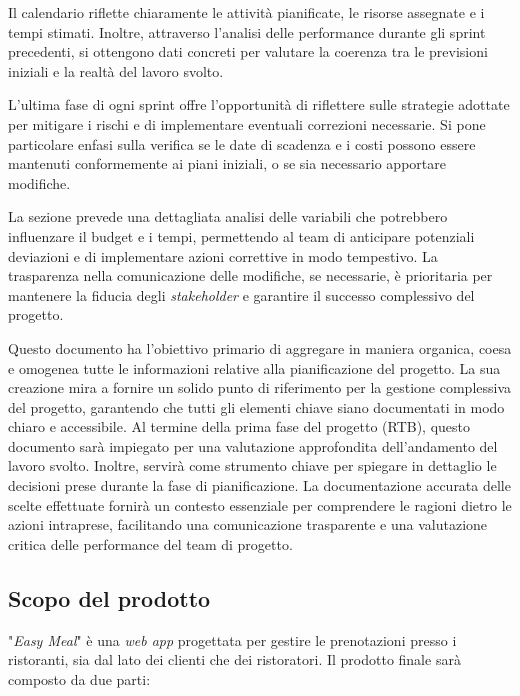 \begin{itemize}
		Il calendario riflette chiaramente le attività pianificate, le risorse assegnate 
		e i tempi stimati. 
		Inoltre, attraverso l'analisi delle performance durante gli sprint precedenti, 
		si ottengono dati concreti per valutare la coerenza tra le previsioni iniziali 
		e la realtà del lavoro svolto.
	
		L'ultima fase di ogni sprint offre l'opportunità di riflettere sulle strategie 
		adottate per mitigare i rischi e di implementare eventuali correzioni necessarie. 
		Si pone particolare enfasi sulla verifica se le date di scadenza e i costi possono 
		essere mantenuti conformemente ai piani iniziali, o se sia necessario apportare modifiche.
	
		La sezione prevede una dettagliata analisi delle variabili che potrebbero influenzare 
		il budget e i tempi, permettendo al team di anticipare potenziali deviazioni e di 
		implementare azioni correttive in modo tempestivo. La trasparenza nella comunicazione 
		delle modifiche, se necessarie, è prioritaria per mantenere la fiducia degli \textit{stakeholder} 
		e garantire il successo complessivo del progetto.
\end{itemize}
Questo documento ha l'obiettivo primario di aggregare in maniera organica, coesa e 
omogenea tutte le informazioni relative alla pianificazione del progetto. 
La sua creazione mira a fornire un solido punto di riferimento per la gestione complessiva del progetto, 
garantendo che tutti gli elementi chiave siano documentati in modo chiaro e accessibile. 
\newline 
Al termine della prima fase del progetto (RTB), questo documento sarà impiegato per una valutazione 
approfondita dell'andamento del lavoro svolto. Inoltre, servirà come strumento chiave per spiegare 
in dettaglio le decisioni prese durante la fase di pianificazione. 
La documentazione accurata delle scelte effettuate fornirà un contesto essenziale per comprendere 
le ragioni dietro le azioni intraprese, facilitando una comunicazione trasparente e una 
valutazione critica delle performance del team di progetto.

\subsection{Scopo del prodotto}

"\textit{Easy Meal}" è una \textit{web app} progettata per gestire le
prenotazioni presso i ristoranti, sia dal lato dei clienti che dei ristoratori.
Il prodotto finale sarà composto da due parti:

